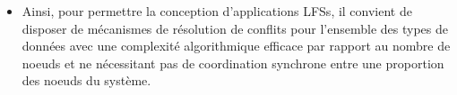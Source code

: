 \begin{itemize}
      Ainsi, de part l'absence de garantie sur le nombre de noeuds connectés de manière stable, les applications \acp{LFS} ne peuvent pas utiliser des mécanismes de résolution de conflits reposant sur une coordination synchrone d'une proportion des noeuds du système, \ie sur des algorithmes de consensus \cite{1998-paxos-lamport, 2014-raft-ongaro}.
    \item Ainsi, pour permettre la conception d'applications \acp{LFS}, il convient de disposer de mécanismes de résolution de conflits pour l'ensemble des types de données avec une complexité algorithmique efficace par rapport au nombre de noeuds et ne nécessitant pas de coordination synchrone entre une proportion des noeuds du système.
\end{itemize}









